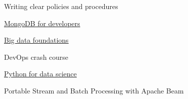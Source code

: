 %
%
%


\begin{coursework}


        {Writing clear policies and procedures}

        {\href{https://university.mongodb.com/course_completion/30f19185172f43e58ae4a0cd9ce13ff0}
        {\underline{MongoDB for developers}}}



        {\href{https://www.youracclaim.com/badges/fb7b0207-6a42-49fc-bf3e-48d139e150c6/public_url}
        {\underline{Big data foundations}}}


        {DevOps crash course}

        {\href{https://courses.edx.org/certificates/0626a02340944e6b9b1854be5e171da0}
        {\underline{Python for data science}}}

        {Portable Stream and Batch Processing with Apache Beam}



\end{coursework}
